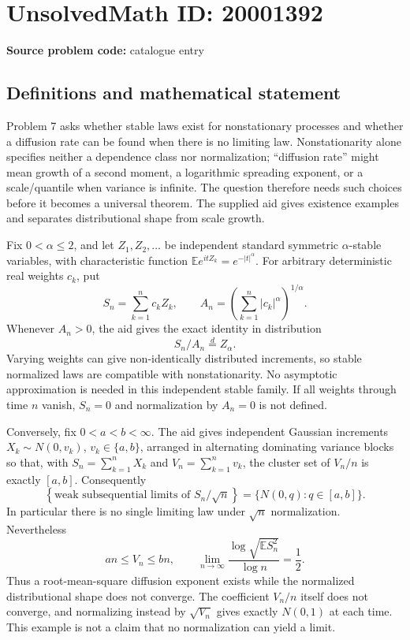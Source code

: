 \documentclass[11pt]{article}
\newcommand{\E}{\mathbb{E}}
\begin{document}
\section*{UnsolvedMath ID: 20001392}
\textbf{Source problem code:} catalogue entry
\subsection{Definitions and mathematical statement}
Problem 7 asks whether stable laws exist for nonstationary processes and whether a diffusion rate can be found when there is no limiting law. Nonstationarity alone specifies neither a dependence class nor normalization; ``diffusion rate'' might mean growth of a second moment, a logarithmic spreading exponent, or a scale/quantile when variance is infinite. The question therefore needs such choices before it becomes a universal theorem. The supplied aid gives existence examples and separates distributional shape from scale growth.

Fix \(0<\alpha\le2\), and let \(Z_1,Z_2,\ldots\) be independent standard symmetric \(\alpha\)-stable variables, with characteristic function \(\E e^{itZ_k}=e^{-|t|^\alpha}\). For arbitrary deterministic real weights \(c_k\), put
\[
S_n=\sum_{k=1}^nc_kZ_k,\qquad A_n=\left(\sum_{k=1}^n|c_k|^\alpha\right)^{1/\alpha}.
\]
Whenever \(A_n>0\), the aid gives the exact identity in distribution
\[
S_n/A_n\overset{d}=Z_\alpha.
\]
Varying weights can give non-identically distributed increments, so stable normalized laws are compatible with nonstationarity. No asymptotic approximation is needed in this independent stable family. If all weights through time \(n\) vanish, \(S_n=0\) and normalization by \(A_n=0\) is not defined.

Conversely, fix \(0<a<b<\infty\). The aid gives independent Gaussian increments \(X_k\sim N(0,v_k)\), \(v_k\in\{a,b\}\), arranged in alternating dominating variance blocks so that, with \(S_n=\sum_{k=1}^nX_k\) and \(V_n=\sum_{k=1}^nv_k\), the cluster set of \(V_n/n\) is exactly \([a,b]\). Consequently
\[
\left\{\text{weak subsequential limits of }S_n/\sqrt n\right\}
=\{N(0,q):q\in[a,b]\}.
\]
In particular there is no single limiting law under \(\sqrt n\) normalization. Nevertheless
\[
a n\le V_n\le b n,\qquad
\lim_{n\to\infty}\frac{\log\sqrt{\E S_n^2}}{\log n}=\frac12.
\]
Thus a root-mean-square diffusion exponent exists while the normalized distributional shape does not converge. The coefficient \(V_n/n\) itself does not converge, and normalizing instead by \(\sqrt{V_n}\) gives exactly \(N(0,1)\) at each time. This example is not a claim that no normalization can yield a limit.
\end{document}
